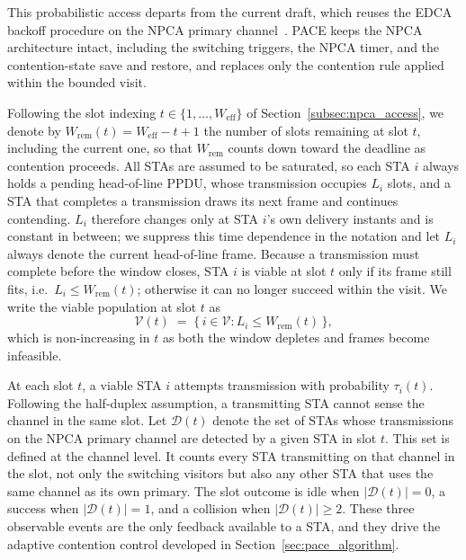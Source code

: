 \documentclass[conference]{IEEEtran}
\begin{document}
This probabilistic access departs from the current draft, which reuses
the EDCA backoff procedure on the NPCA primary channel~\cite{ieee80211bn}. PACE keeps the NPCA architecture intact, including the switching triggers, the NPCA timer, and the contention-state save and restore, and replaces only the contention rule applied within the bounded visit. 

Following the slot indexing $t\in\{1,\dots,W_\mathrm{eff}\}$ of Section~\ref{subsec:npca_access}, we denote by $W_\mathrm{rem}(t)=W_\mathrm{eff}-t+1$ the number of slots remaining at slot $t$, including the current one, so that $W_\mathrm{rem}$ counts down toward the deadline as contention proceeds. All STAs are assumed to be saturated, so each STA $i$ always holds a pending head-of-line PPDU, whose transmission occupies $L_i$ slots, and a STA that completes a transmission draws its next frame and continues contending. $L_i$ therefore changes only at STA $i$'s own delivery instants and is constant in between; we suppress this time dependence in the notation and let $L_i$ always denote the current head-of-line frame. Because a transmission must complete before the window closes, STA $i$ is viable at slot $t$ only if its frame still fits, i.e.\ $L_i \le W_\mathrm{rem}(t)$; otherwise it can no longer succeed within the visit. We write the viable population at slot $t$ as
\begin{equation}
    \mathcal{V}(t) \;=\; \bigl\{\, i\in\mathcal{V} :
    L_i \le W_\mathrm{rem}(t) \,\bigr\},
    \label{eq:viable}
\end{equation}
which is non-increasing in $t$ as both the window depletes and frames become infeasible.

At each slot $t$, a viable STA $i$ attempts transmission with probability $\tau_i(t)$. Following the half-duplex assumption, a transmitting STA cannot sense the channel in the same slot. Let $\mathcal{D}(t)$ denote the set of STAs whose transmissions on the NPCA primary channel are detected by a given STA in slot $t$. This set is defined at the channel level. It counts every STA transmitting on that channel in the slot, not only the switching visitors but also any other STA that uses the same channel as its own primary. The slot outcome is idle when $|\mathcal{D}(t)|=0$, a success when $|\mathcal{D}(t)|=1$, and a collision when $|\mathcal{D}(t)|\ge 2$. These three observable events are the only feedback available to a STA, and they drive the adaptive contention control developed in Section~\ref{sec:pace_algorithm}.
\end{document}
